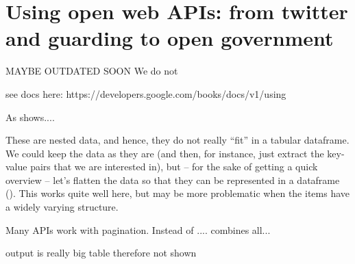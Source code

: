 \section{Using open web APIs: from twitter and guarding to open government}
\label{sec:apis}




MAYBE OUTDATED SOON
We do not

see docs here:
https://developers.google.com/books/docs/v1/using


As  shows....




These are nested data, and hence, they do not really ``fit'' in a tabular dataframe. We could keep the data as they are (and then, for instance, just extract the key-value pairs that we are interested in), but -- for the sake of getting a quick overview -- let's flatten the data so that they can be represented in a dataframe (). This works quite well here, but may be more problematic when the items have a widely varying structure.


Many APIs work with pagination. Instead of ....  combines all...



output is really big table therefore not shown
